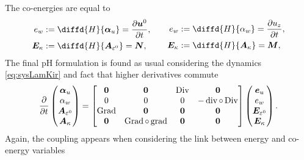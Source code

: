 The co-energies are equal to
\begin{equation}
\begin{aligned}
e_w &:= \diffd{H}{\bm\alpha_u} = \diffp{\bm{u}^0}{t},\\
\bm{E}_{\kappa} &:= \diffd{H}{\bm{A}_{\varepsilon^0}} = \bm{N},\\
\end{aligned} \qquad
\begin{aligned}
e_w &:= \diffd{H}{\alpha_w} = \diffp{u_z}{t}, \\
\bm{E}_{\kappa} &:= \diffd{H}{\bm{A}_{\kappa}} = \bm{M}, \\
\end{aligned} 
\end{equation}
The final pH formulation is found as usual considering the dynamics \eqref{eq:sysLamKir} and fact that higher derivatives commute
\begin{equation}\label{eq:phsysLamKir}
\diffp{}{t}
\begin{pmatrix}
\bm\alpha_u \\
\alpha_w \\
\bm{A}_{\varepsilon^0} \\
\bm{A}_\kappa \\
\end{pmatrix} = 
\begin{bmatrix}
\bm{0} & \bm{0} &  \Div & \bm{0} \\
0 & 0 & 0 & -\div\circ\Div \\
\Grad & \bm{0} & \bm{0}  & \bm{0} \\
\bm{0} & \Grad\circ\grad & \bm{0} & \bm{0} \\
\end{bmatrix}
\begin{pmatrix}
\bm{e}_u \\
e_w \\
\bm{E}_{\varepsilon^0} \\
\bm{E}_{\kappa} \\
\end{pmatrix}.
\end{equation}
Again, the coupling appears when considering the link between energy and co-energy variables
